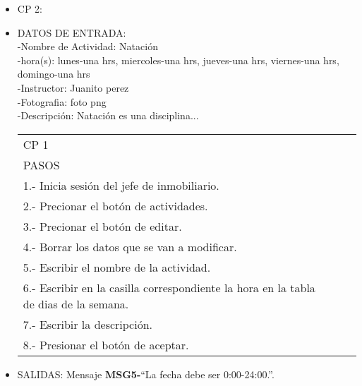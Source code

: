 \begin{itemize}
	\item CP 2:
	\item DATOS DE ENTRADA:\\
	-Nombre de Actividad: Natación\\
	-hora(s): lunes-una hrs, miercoles-una hrs, jueves-una hrs, viernes-una hrs, domingo-una hrs\\
	-Instructor: Juanito perez\\
	-Fotografia: foto png\\
	-Descripción: Natación es una disciplina...
	\begin{center}			
		\begin{tabular}{|l|l|l|l|}
			\hline
			CP 1\\
			PASOS\\
			\hline 1.- Inicia sesión del jefe de inmobiliario.\\
			\hline 2.- Precionar el botón de actividades.\\
			\hline 3.- Precionar el botón de editar.\\
			\hline 4.- Borrar los datos que se van a modificar.\\
			\hline 5.- Escribir el  nombre de la actividad.\\
			\hline 6.- Escribir en la casilla correspondiente la hora en la tabla
			de dias de la semana.\\
			\hline 7.- Escribir la descripción.\\
			\hline 8.- Presionar el botón de aceptar.\\
			\hline
		\end{tabular}
	\end{center}
	\item SALIDAS: Mensaje {\bf MSG5-}``La fecha debe ser 0:00-24:00.''.
	
\end{itemize}
